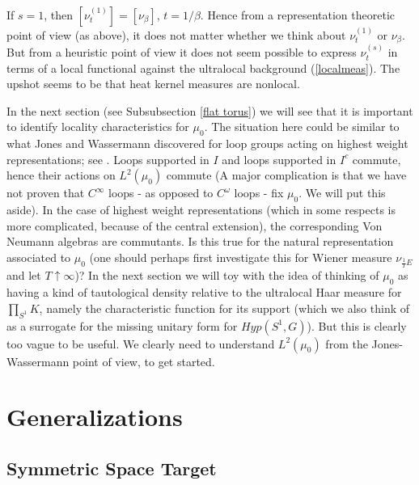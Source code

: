 \documentclass{amsart}
\theoremstyle{conjecture}
\theoremstyle{definition}
\theoremstyle{question}
\theoremstyle{questions}
\theoremstyle{remark}
\theoremstyle{remarks}
\theoremstyle{example}
\numberwithin{equation}{section}
\begin{document}
If $s=1$, then $[\nu_t^{(1)}]=[\nu_{\beta}]$, $t=1/\beta$. Hence from a representation theoretic point of view (as above), it does not matter whether we think about $\nu_t^{(1)}$ or $\nu_{\beta}$. But from a heuristic point of view it does not seem possible to express $\nu^{(s)}_t$ in terms of a local functional against the ultralocal background (\ref{localmeas}). The upshot seems to be that heat kernel measures are nonlocal.

In the next section (see Subsubsection \ref{flat torus}) we will see that it is important to identify locality characteristics for $\mu_0$.
The situation here could be similar to what Jones and Wassermann
discovered for loop groups acting on highest weight representations; see \cite{Wassermann}. Loops supported in $I$ and loops supported in $I^c$ commute, hence their actions on $L^2(\mu_0)$ commute (A major complication is that we have not proven that $C^{\infty}$ loops - as opposed to $C^{\omega}$ loops - fix $\mu_0$. We will put this aside). In the case of highest weight representations (which in some respects is more complicated, because of the central extension), the corresponding Von Neumann algebras are commutants. Is this true for the natural representation associated to $\mu_0$ (one should perhaps first investigate this for Wiener measure $\nu_{\frac 1T E}$ and let $T\uparrow\infty$)? In the next section we will toy with the idea of thinking of $\mu_0$ as having a kind of tautological density relative to the ultralocal Haar measure for $\prod_{S^1}K$, namely the characteristic function for its support (which we also think of as a surrogate for the missing unitary form for $Hyp(S^1,G)$). But this is clearly too vague to be useful. We clearly need to understand $L^2(\mu_0)$ from the Jones-Wassermann point of view, to get started.



\section{ Generalizations}\label{Generalizations}



\subsection{Symmetric Space Target}
\end{document}

